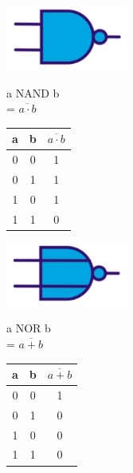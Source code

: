 \begin{minipage}{.4\textwidth}
	\centering
	\includegraphics[width=4cm]{figures/ch13/symbol_nand.jpg}
	\label{fig:symbol_nand}
\end{minipage}%
\begin{minipage}{.2\textwidth}
	a NAND b \\= $\overline{a \cdot b}$
\end{minipage}%
\begin{minipage}{.4\textwidth}
	\begin{tabular}{|c|c|c|}
		\hline
		a & b  & $\overline{a \cdot b}$ \\
		\hline\hline
		0 & 0 & 1 \\
		\hline
		0 & 1 & 1 \\
		\hline
		1 & 0 & 1 \\
		\hline
		1 & 1 & 0 \\
		\hline
	\end{tabular}
\end{minipage}

\begin{minipage}{.4\textwidth}
	\centering
	\includegraphics[width=4cm]{figures/ch13/symbol_nor.jpg}
	\label{fig:symbol_nor}
\end{minipage}%
\begin{minipage}{.2\textwidth}
	a NOR b \\= $\overline{a + b}$
\end{minipage}%
\begin{minipage}{.4\textwidth}
	\begin{tabular}{|c|c|c|}
		\hline
		a & b  & $\overline{a + b}$ \\
		\hline\hline
		0 & 0 & 1 \\
		\hline
		0 & 1 & 0 \\
		\hline
		1 & 0 & 0 \\
		\hline
		1 & 1 & 0 \\
		\hline
	\end{tabular}
\end{minipage}

